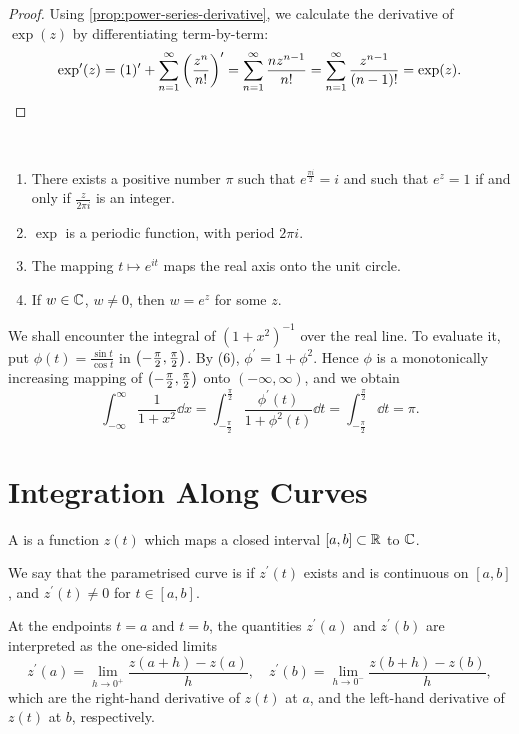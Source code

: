 \begin{proof}
Using \ref{prop:power-series-derivative}, we calculate the derivative of $\exp(z)$ by differentiating term-by-term:
\[\exp^\prime(z)=(1)^\prime+\sum_{n=1}^\infty\left(\frac{z^n}{n!}\right)^\prime=\sum_{n=1}^\infty\frac{nz^{n-1}}{n!}=\sum_{n=1}^\infty\frac{z^{n-1}}{(n-1)!}=\exp(z).\]
\end{proof}

\begin{lemma} \
\begin{enumerate}[label=(\roman*)]
\item There exists a positive number $\pi$ such that $e^\frac{\pi i}{2}=i$ and such that $e^z=1$ if and only if $\frac{z}{2\pi i}$ is an integer.
\item $\exp$ is a periodic function, with period $2\pi i$. 
\item The mapping $t\mapsto e^{it}$ maps the real axis onto the unit circle.
\item If $w\in\mathbb C$, $w\neq0$, then $w=e^z$ for some $z$.
\end{enumerate}
\end{lemma}

We shall encounter the integral of $(1+x^2)^{-1}$ over the real line. To evaluate it, put $\phi(t)=\frac{\sin t}{\cos t}$ in $\left(-\frac{\pi}{2},\frac{\pi}{2}\right)$. By (6), $\phi^\prime=1+\phi^2$. Hence $\phi$ is a monotonically increasing mapping of $\left(-\frac{\pi}{2},\frac{\pi}{2}\right)$ onto $(-\infty,\infty)$, and we obtain 
\[\int_{-\infty}^{\infty}\frac{1}{1+x^2}\dd{x}=\int_{-\frac{\pi}{2}}^{\frac{\pi}{2}}\frac{\phi^\prime(t)}{1+\phi^2(t)}\dd{t}=\int_{-\frac{\pi}{2}}^{\frac{\pi}{2}}\dd{t}=\pi.\]
\pagebreak

\section{Integration Along Curves}
\begin{definition}
A  is a function $z(t)$ which maps a closed interval $[a,b]\subset\mathbb R$ to $\mathbb C$.

We say that the parametrised curve is  if $z^\prime(t)$ exists and is continuous on $[a,b]$, and $z^\prime(t)\neq 0$ for $t\in[a,b]$.
\end{definition}

\begin{remark}
At the endpoints $t=a$ and $t=b$, the quantities $z^\prime(a)$ and $z^\prime(b)$ are interpreted as the one-sided limits
\[z^\prime(a)=\lim_{h\to 0^+}\frac{z(a+h)-z(a)}{h},\quad 
z^\prime(b)=\lim_{h\to 0^-}\frac{z(b+h)-z(b)}{h},\]
which are the right-hand derivative of $z(t)$ at $a$, and the left-hand derivative of $z(t)$ at $b$, respectively.
\end{remark}

